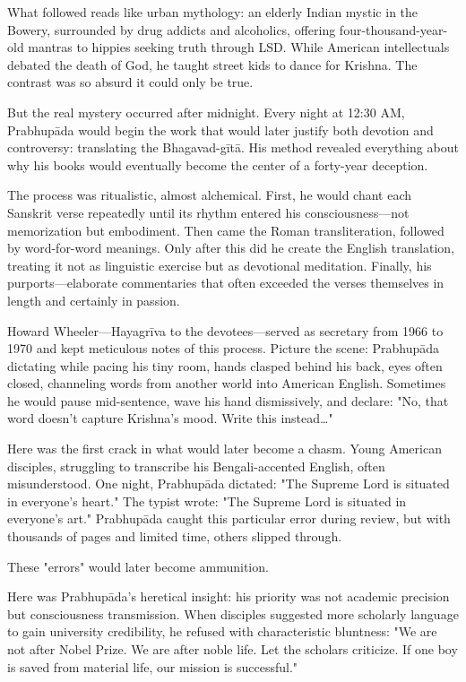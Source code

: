 \documentclass[11pt,twoside]{book}
\begin{document}
What followed reads like urban mythology: an elderly Indian mystic in the Bowery, surrounded by drug addicts and alcoholics, offering four-thousand-year-old mantras to hippies seeking truth through LSD. While American intellectuals debated the death of God, he taught street kids to dance for Krishna. The contrast was so absurd it could only be true.

But the real mystery occurred after midnight. Every night at 12:30 AM, Prabhupāda would begin the work that would later justify both devotion and controversy: translating the Bhagavad-gītā. His method revealed everything about why his books would eventually become the center of a forty-year deception.

The process was ritualistic, almost alchemical. First, he would chant each Sanskrit verse repeatedly until its rhythm entered his consciousness—not memorization but embodiment. Then came the Roman transliteration, followed by word-for-word meanings. Only after this did he create the English translation, treating it not as linguistic exercise but as devotional meditation. Finally, his purports—elaborate commentaries that often exceeded the verses themselves in length and certainly in passion.

Howard Wheeler—Hayagrīva to the devotees—served as secretary from 1966 to 1970 and kept meticulous notes of this process. Picture the scene: Prabhupāda dictating while pacing his tiny room, hands clasped behind his back, eyes often closed, channeling words from another world into American English. Sometimes he would pause mid-sentence, wave his hand dismissively, and declare: "No, that word doesn't capture Krishna's mood. Write this instead\ldots{}"

Here was the first crack in what would later become a chasm. Young American disciples, struggling to transcribe his Bengali-accented English, often misunderstood. One night, Prabhupāda dictated: "The Supreme Lord is situated in everyone's heart." The typist wrote: "The Supreme Lord is situated in everyone's art." Prabhupāda caught this particular error during review, but with thousands of pages and limited time, others slipped through.

These "errors" would later become ammunition.

Here was Prabhupāda's heretical insight: his priority was not academic precision but consciousness transmission. When disciples suggested more scholarly language to gain university credibility, he refused with characteristic bluntness: "We are not after Nobel Prize. We are after noble life. Let the scholars criticize. If one boy is saved from material life, our mission is successful."
\end{document}
